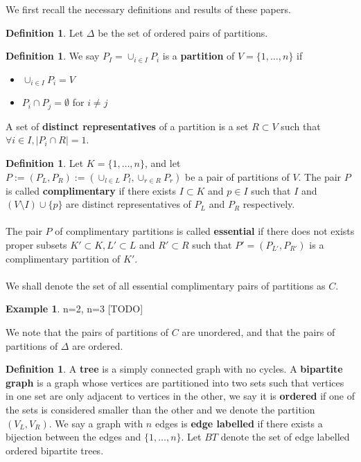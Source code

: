 \documentclass[11pt]{amsart}
\theoremstyle{definition}
\newtheorem{definition}[thm]{Definition}
\newtheorem{example}[thm]{Example}
\theoremstyle{remark}
\numberwithin{equation}{section}
\newcommand{\EC}{C}
\newcommand{\OP}{\Delta}
\newcommand{\BT}{BT}
\newcommand{\0}{\color{blue}{\mathsf{0}}}
\begin{document}
We first recall the necessary definitions and results of these papers.

\begin{definition}
Let $\OP$ be the set of ordered pairs of partitions.
\end{definition}

\begin{definition}
We say $P_I = \cup_{i\in I} P_i$ is a \textbf{partition} of $V = \{1,\dots,n\}$ if 
\begin{itemize}
    \item $ \cup_{i\in I} P_i = V$
    \item $P_i \cap P_j = \emptyset$ for $i \neq j$
\end{itemize}
A set of \textbf{distinct representatives} of a partition is a set $R\subset V$ such that $\forall i \in I,|P_i \cap R| = 1$.

\end{definition}


\begin{definition}
Let $K = \{1,\dots,n\}$, and let $P:=(P_L,P_R):=(\cup_{l\in L} P_l , \cup_{r\in R} P_r)$ be a pair of partitions of $V$. The pair $P$ is called \textbf{complimentary} if there exists $I\subset K$ and $p \in I$ such that $I$ and $(V\setminus I) \cup \{p\}$ are distinct representatives of $P_L$ and $P_R$ respectively.
\\\\
The pair $P$ of complimentary partitions is called \textbf{essential} if there does not exists proper subsets $K' \subset K, L'\subset L$ and $R'\subset R$ such that $P'=(P_{L'},P_{R'})$ is a complimentary partition of $K'$.
\\\\
We shall denote the set of all essential complimentary pairs of partitions as $\EC$.
\end{definition}

\begin{example}
n=2, n=3 [TODO]
\end{example}

We note that the pairs of partitions of $\EC$ are unordered, and that the pairs of partitions of $\OP$ are ordered.

\begin{definition}
A \textbf{tree} is a simply connected graph with no cycles. A \textbf{bipartite graph} is a graph whose vertices are partitioned into two sets such that vertices in one set are only adjacent to vertices in the other, we say it is \textbf{ordered} if one of the sets is considered smaller than the other and we denote the partition $(V_L,V_R)$. We say a graph with $n$ edges is \textbf{edge labelled} if there exists a bijection between the edges and $\{1,\dots,n\}$.
Let $\BT$ denote the set of edge labelled ordered bipartite trees.
\end{definition}
\end{document}
